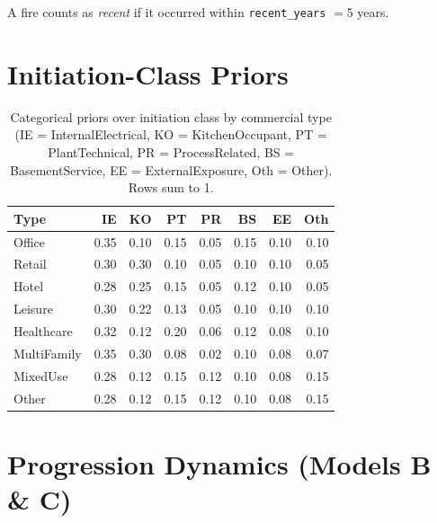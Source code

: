 \documentclass[11pt,a4paper]{article}
\begin{document}
\noindent A fire counts as \emph{recent} if it occurred within
\texttt{recent\_years} $= 5$ years.

\section{Initiation-Class Priors}
\label{app:priors}

\begin{table}[H]
\centering
\caption{Categorical priors over initiation class by commercial type
(IE = Internal\-Electrical, KO = Kitchen\-Occupant, PT = Plant\-Technical,
PR = Process\-Related, BS = Basement\-Service, EE = External\-Exposure,
Oth = Other). Rows sum to 1.}
\begin{tabular}{lrrrrrrr}
\toprule
Type & IE & KO & PT & PR & BS & EE & Oth \\
\midrule
Office      & 0.35 & 0.10 & 0.15 & 0.05 & 0.15 & 0.10 & 0.10 \\
Retail      & 0.30 & 0.30 & 0.10 & 0.05 & 0.10 & 0.10 & 0.05 \\
Hotel       & 0.28 & 0.25 & 0.15 & 0.05 & 0.12 & 0.10 & 0.05 \\
Leisure     & 0.30 & 0.22 & 0.13 & 0.05 & 0.10 & 0.10 & 0.10 \\
Healthcare  & 0.32 & 0.12 & 0.20 & 0.06 & 0.12 & 0.08 & 0.10 \\
MultiFamily & 0.35 & 0.30 & 0.08 & 0.02 & 0.10 & 0.08 & 0.07 \\
MixedUse    & 0.28 & 0.12 & 0.15 & 0.12 & 0.10 & 0.08 & 0.15 \\
Other       & 0.28 & 0.12 & 0.15 & 0.12 & 0.10 & 0.08 & 0.15 \\
\bottomrule
\end{tabular}
\end{table}

\section{Progression Dynamics (Models B \& C)}
\label{app:progression}
\end{document}
